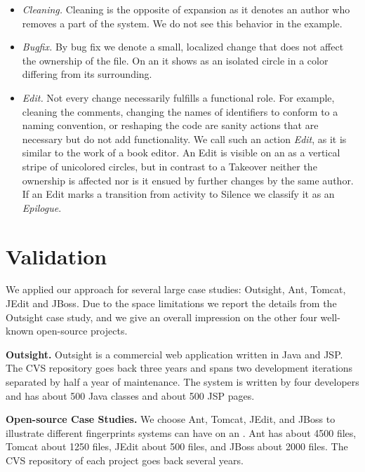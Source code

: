 \begin{itemize}
\item \emph{Cleaning.} Cleaning is the opposite of expansion as it denotes an author who removes a part of the system. We do not see this behavior in the example.

\item \emph{Bugfix.} By bug fix we denote a small, localized change that does not affect the ownership of the file. On an \omap it shows as an isolated circle in a color differing from its surrounding.

\item \emph{Edit.} Not every change necessarily fulfills a functional role. For example, cleaning the comments, changing the names of identifiers to conform to a naming convention, or reshaping the code are sanity actions that are necessary but do not add functionality. We call such an action \emph{Edit}, as it is similar to the work of a book editor. An Edit is visible on an \omap as a vertical stripe of unicolored circles, but in contrast to a Takeover neither the ownership is affected nor is it ensued by further changes by the same author. If an Edit marks a transition from activity to Silence we classify it as an \emph{Epilogue}.

\end{itemize}

\section{Validation}\label{sec:validation}

We applied our approach for several large case studies: Outsight, Ant, Tomcat, JEdit and JBoss. Due to the space limitations we report the details from the Outsight case study, and we give an overall impression on the other four well-known open-source projects.

\textbf{Outsight.} Outsight is a commercial web application written in Java and JSP. The CVS repository goes back three years and spans two development iterations separated by half a year of maintenance. The system is written by four developers and has about 500 Java classes and about 500 JSP pages.

\textbf{Open-source Case Studies.} We choose Ant, Tomcat, JEdit, and JBoss to illustrate different fingerprints systems can have on an \omap. Ant has about 4500 files, Tomcat about 1250 files, JEdit about 500 files, and JBoss about 2000 files. The CVS repository of each project goes back several years.

